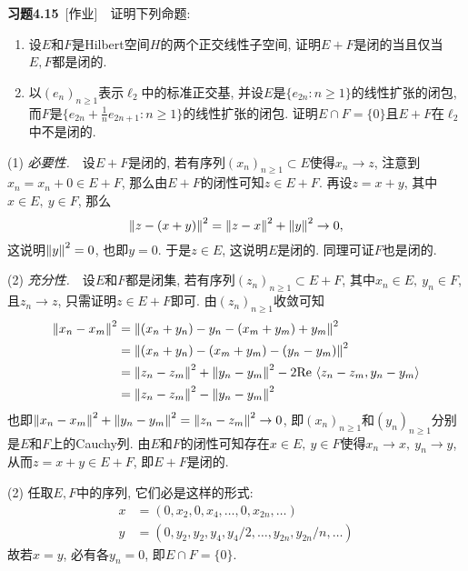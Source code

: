 	\textbf{习题4.15}\ [作业]\ \ 证明下列命题:
	\begin{enumerate}[(1)]
	\item 设$ E $和$ F $是Hilbert空间$ H $的两个正交线性子空间, 证明$ E+F $是闭的当且仅当$ E, F $都是闭的.
	\item 以$ (e_n)_{n\geqslant 1} $表示$ \ell_2 $中的标准正交基, 并设$ E $是$ \{ e_{2n} : n\geqslant 1 \} $的线性扩张的闭包, 而$ F $是$ \{ e_{2n}+\frac{1}{n}e_{2n+1} : n\geqslant 1 \} $的线性扩张的闭包. 证明$ E\cap F=\{0\} $且$ E+F $在$ \ell_2 $中不是闭的.
	\end{enumerate}
	\begin{Proof}
	(1) \textsl{必要性.}\ \ 设$ E+F $是闭的, 若有序列$ (x_n)_{n\geqslant 1}\subset E $使得$ x_n\to z $, 注意到$ x_n=x_n+0\in E+F $, 那么由$ E+F $的闭性可知$ z\in E+F $. 再设$ z=x+y $, 其中$ x\in E,\ y\in F $, 那么
	\[
	\left\| z-(x+y) \right\|^2=\left\| z-x \right\|^2+\left\| y \right\|^2\to 0,
	\]
	这说明$ \left\| y \right\|^2=0 $, 也即$ y=0 $. 于是$ z\in E $, 这说明$ E $是闭的. 同理可证$ F $也是闭的.
	
	(2) \textsl{充分性.}\ \ 设$ E $和$ F $都是闭集, 若有序列$ (z_n)_{n\geqslant 1}\subset E+F $, 其中$ x_n\in E,\ y_n\in F $, 且$ z_n\to z $, 只需证明$ z\in E+F $即可. 由$ (z_n)_{n\geqslant 1} $收敛可知
	\[
	\begin{aligned}
	\left\| x_n-x_m \right\|^2&=\left\| (x_n+y_n)-y_n-(x_m+y_m)+y_m \right\|^2\\
	&=\left\| (x_n+y_n)-(x_m+y_m)-(y_n-y_m) \right\|^2\\
	&=\left\| z_n-z_m \right\|^2+\left\| y_n-y_m \right\|^2-2\mathrm{Re\,}\left\langle z_n-z_m,y_n-y_m \right\rangle\\
	&=\left\| z_n-z_m \right\|^2-\left\| y_n-y_m \right\|^2
	\end{aligned}
	\]
	也即$ \left\| x_n-x_m \right\|^2+\left\| y_n-y_m \right\|^2=\left\| z_n-z_m \right\|^2\to 0 $, 即$ (x_n)_{n\geqslant 1} $和$ (y_n)_{n\geqslant 1} $分别是$ E $和$ F $上的Cauchy列. 由$ E $和$ F $的闭性可知存在$ x\in E,\ y\in F $使得$ x_n\to x,\ y_n\to y $, 从而$ z=x+y\in E+F $, 即$ E+F $是闭的.
	
	(2) 任取$ E, F $中的序列, 它们必是这样的形式:
	\[
	\begin{aligned}
	x & = (0,x_2,0,x_4,\dots,0,x_{2n},\dots)\\
	y & = (0,y_2,y_2,y_4,y_4/2,\dots,y_{2n},y_{2n}/n,\dots)
	\end{aligned}
	\]
	故若$ x=y $, 必有各$ y_n=0 $, 即$ E\cap F=\{0\} $.
	

\end{Proof}

